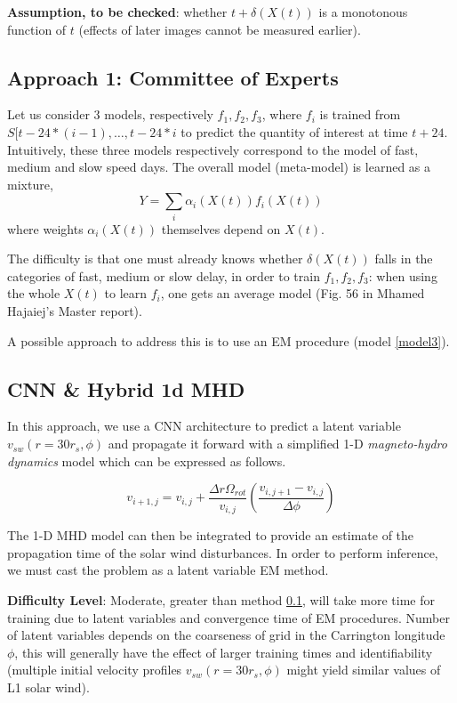 \documentclass[]{article}
\theoremstyle{definition}
\begin{document}
{\bf Assumption, to be checked}: whether $t + \delta(X(t))$ is a monotonous function of $t$ (effects of later images cannot be measured earlier).

\subsection{Approach 1: Committee of Experts}\label{model1}
Let us consider 3 models, respectively 
$f_1, f_2, f_3$, where $f_i$ is trained from $S[t-24*(i-1), \ldots, t-24*i$ to predict the quantity of interest at time $t+24$.
Intuitively, these three models respectively correspond to the model of fast, medium and slow speed days. The overall model (meta-model) is learned as a mixture, 
\[ Y = \sum_i \alpha_i(X(t)) f_i(X(t)) \]
where weights $\alpha_i(X(t))$ themselves depend on $X(t)$. 

The difficulty is that one must already knows whether $\delta(X(t))$ falls in the categories of fast, medium or slow delay, in order to train $f_1, f_2, f_3$: when using the whole $X(t)$ to learn $f_i$, one gets an average model (Fig. 56 in Mhamed Hajaiej's Master report).

A possible approach to address this is to use an EM procedure (model \ref{model3}).

\subsection{CNN \& Hybrid 1d MHD}

In this approach, we use a CNN architecture to predict a latent variable $v_{sw}(r = 30r_s, \phi)$ and propagate it forward with a simplified 1-D \textit{magneto-hydro dynamics} model which can be expressed as follows.

\begin{equation}
    v_{i+1,j} = v_{i,j} + \frac{\Delta r \Omega_{rot}}{v_{i,j}} \left (\frac{v_{i,j+1} - v_{i,j}}{\Delta \phi} \right )
\end{equation}

The 1-D MHD model can then be integrated to provide an estimate of the propagation time of the solar wind disturbances. In order to perform inference, we must cast the problem as a latent variable EM method. 

\textbf{Difficulty Level}: Moderate, greater than method \ref{model1}, will take more time for training due to latent variables and convergence time of EM procedures. Number of latent variables depends on the coarseness of grid in the Carrington longitude $\phi$, this will generally have the effect of larger training times and identifiability (multiple initial velocity profiles $v_{sw}(r = 30r_s, \phi)$ might yield similar values of L1 solar wind).
\end{document}
